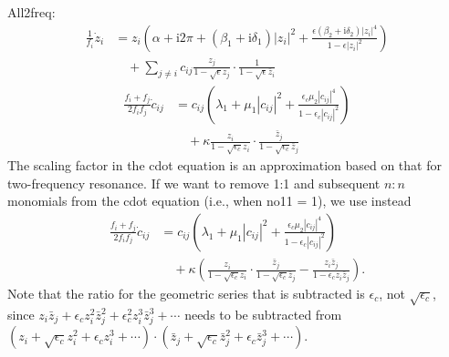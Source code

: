\documentclass{report}
\begin{document}
\bigskip \bigskip
\noindent All2freq:
\begin{equation*}
\begin{split}
\frac{1}{f_i}\dot{z}_i& = z_i\left(\alpha + \textrm{i}2\pi + \left(\beta_1 + \textrm{i} \delta_1\right)|z_i|^2
+ \frac{\epsilon\left(\beta_2 + \textrm{i} \delta_2\right)|z_i|^4}{1-\epsilon |z_i|^2}\right)\\
& \quad + \displaystyle\sum_{j \neq i} c_{ij} \frac{z_j}{1-\sqrt{\epsilon}z_j} \cdot \frac{1}{1-\sqrt{\epsilon}\bar{z}_i}
\end{split}
\end{equation*}
\begin{equation*}
\begin{split}
\frac{f_i+f_j}{2f_i f_j}\dot{c}_{ij}& = c_{ij}\left(\lambda_1 + \mu_1 |c_{ij}|^2
+ \frac{\epsilon_c\mu_2 |c_{ij}|^4}{1-\epsilon_c |c_{ij}|^2}\right)\\
& \quad + \kappa \frac{z_i}{1-\sqrt{\epsilon_c}z_i} \cdot \frac{\bar{z}_j}{1-\sqrt{\epsilon_c}\bar{z}_j}
\end{split}
\end{equation*}
The scaling factor in the cdot equation is an approximation based on that for two-frequency resonance. If we want to remove 1:1 and subsequent $n:n$ monomials from the cdot equation (i.e., when no11 = 1), we use instead
\begin{equation*}
\begin{split}
\frac{f_i+f_j}{2f_i f_j}\dot{c}_{ij}& = c_{ij}\left(\lambda_1 + \mu_1 |c_{ij}|^2
+ \frac{\epsilon_c\mu_2 |c_{ij}|^4}{1-\epsilon_c |c_{ij}|^2}\right)\\
& \quad + \kappa \left(\frac{z_i}{1-\sqrt{\epsilon_c}z_i} \cdot \frac{\bar{z}_j}{1-\sqrt{\epsilon_c}\bar{z}_j}
- \frac{z_i\bar{z}_j}{1-\epsilon_c z_i\bar{z}_j} \right).
\end{split}
\end{equation*}
Note that the ratio for the geometric series that is subtracted is $\epsilon_c$, not $\sqrt{\epsilon_c}$, since $z_i\bar{z}_j + \epsilon_c z_i^2\bar{z}_j^2 + \epsilon_c^2 z_i^3\bar{z}_j^3 + \cdots$ needs to be subtracted from $(z_i + \sqrt{\epsilon_c} z_i^2 + \epsilon_c z_i^3 + \cdots)\cdot(\bar{z}_j + \sqrt{\epsilon_c} \bar{z}_j^2 + \epsilon_c \bar{z}_j^3 + \cdots)$.
\end{document}
